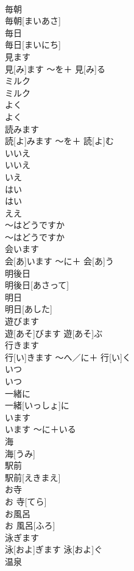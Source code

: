\documentclass[8pt]{extreport}
\begin{document}
\begin{CJK}{UTF8}{min}
\\	毎朝	
\\	毎朝[まいあさ]		
\\	毎日	
\\	毎日[まいにち]		
\\	見ます	
\\	見[み]ます	〜を＋ 見[み]る	
\\	ミルク	
\\	ミルク		
\\	よく	
\\	よく		
\\	読みます	
\\	読[よ]みます	〜を＋ 読[よ]む	
\\	いいえ	
\\	いいえ	
\\	いえ 
\\	はい	
\\	はい	
\\	ええ 
\\	〜はどうですか	
\\	〜はどうですか		
\\	会います	
\\	会[あ]います	〜に＋ 会[あ]う	
\\	明後日	
\\	明後日[あさって]		
\\	明日	
\\	明日[あした]		
\\	遊びます	
\\	遊[あそ]びます	遊[あそ]ぶ	
\\	行きます	
\\	行[い]きます	〜へ／に＋ 行[い]く	
\\	いつ	
\\	いつ		
\\	一緒に	
\\	一緒[いっしょ]に		
\\	います	
\\	います	〜に＋いる	
\\	海	
\\	海[うみ]		
\\	駅前	
\\	駅前[えきまえ]		
\\	お寺	
\\	お 寺[てら]		
\\	お風呂	
\\	お 風呂[ふろ]		
\\	泳ぎます	
\\	泳[およ]ぎます	泳[およ]ぐ	
\\	温泉	

\end{CJK}
\end{document}

